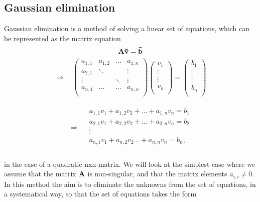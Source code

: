 \documentclass[12pt]{article}
\begin{document}
\begin{flushleft}
\subsection*{Gaussian elimination}
Gaussian elimination is a method of solving a linear set of equations, which can be represented as the matrix equation\\

\begin{equation}\label{eq:the_matrix_eq}
\bf A\bar{v} = \bar{b}
\end{equation}
$$\Rightarrow \quad
    \left(\begin{array}{cccc}
    a_{1,1} & a_{1,2} & \dots & a_{1,n} \\
    a_{2,1} & \ddots &  &\vdots \\
    \vdots &  & \ddots & \vdots \\
    a_{n,1} & \dots & \dots & a_{n,n}\\
    \end{array} \right)    
    \left(\begin{array}{c}
    v_{1}\\
    \vdots\\
    \vdots\\
    v_{n}\\
    \end{array} \right) =
    \left(\begin{array}{c}
    b_{1}\\
    \vdots\\
    \vdots\\
    b_{n}\\
    \end{array} \right)
$$\\
\vspace{5mm}
$$ 
    \Rightarrow\quad
    \begin{array}{c}
    a_{1,1}v_{1} + a_{1,2}v_{2} + \dots + a_{1,n}v_{n} = b_{1}\\
    a_{2,1}v_{1} + a_{2,2}v_{2} + \dots + a_{2,n}v_{n} = b_{2}\\
    \vdots\\
    a_{n,1}v_{1} + a_{n,2}v_{2}\dots + a_{n,n}v_{n} = b_{n},\\    
    \end{array}
$$\\
\vspace{5mm}    
in the case of a quadratic nxn-matrix. We will look at the simplest case where we assume that the matrix $\bf A$ is non-singular, and that the matrix elements $a_{i,i} \neq 0$. In this method the aim is to eliminate the unknowns from the set of equations, in a systematical way, so that the set of equations takes the form\\


\end{flushleft}
\end{document}
